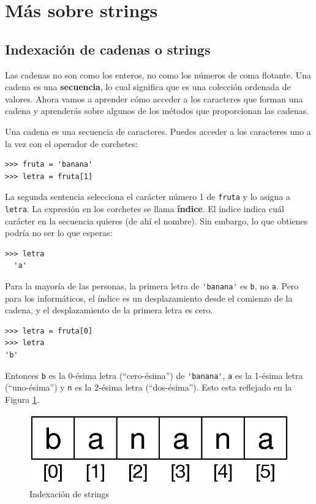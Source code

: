 \section{Más sobre strings}

\subsection{Indexación de cadenas o strings}

Las cadenas no son como los enteros, no como los números de coma flotante. Una cadena
es una \textbf{secuencia}, lo cual significa que es
una colección ordenada de valores.  Ahora vamos a aprender
cómo acceder a los caracteres que forman una cadena y
aprenderás sobre algunos de los métodos que proporcionan las cadenas.

Una cadena es una secuencia de caracteres.
Puedes acceder a los caracteres uno a la vez con el
operador de corchetes:

\begin{Verbatim}[frame=single]
>>> fruta = 'banana'
>>> letra = fruta[1]
\end{Verbatim}
%
La segunda sentencia selecciona el carácter número 1 de \texttt{fruta} y lo asigna a \texttt{letra}.
%
La expresión en los corchetes se llama \textbf{índice}.
El índice indica cuál carácter en la secuencia
quieres (de ahí el nombre).
%
Sin embargo, lo que obtienes podría no ser lo que esperas:

\begin{Verbatim}[frame=single]
>>> letra
  'a'
\end{Verbatim}
%
Para la mayoría de las personas, la primera letra de \verb"'banana'" es \texttt{b}, no
\texttt{a}.  Pero para los informáticos, el índice es un desplazamiento desde el
comienzo de la cadena, y el desplazamiento de la primera letra es cero.

\begin{Verbatim}[frame=single]
>>> letra = fruta[0]
>>> letra
'b'
\end{Verbatim}
%
Entonces \texttt{b} es la 0-ésima letra  (``cero-ésima'') de \verb"'banana'", \texttt{a} es la 1-ésima letra (``uno-ésima'') y \texttt{n} es la 2-ésima letra
(``dos-ésima''). Esto esta reflejado en la Figura \ref{fig:fruta}.

\begin{figure}[t]
    \centering
    \includegraphics{images/string.eps}
    \caption{Indexación de strings}
    \label{fig:fruta}
\end{figure}


